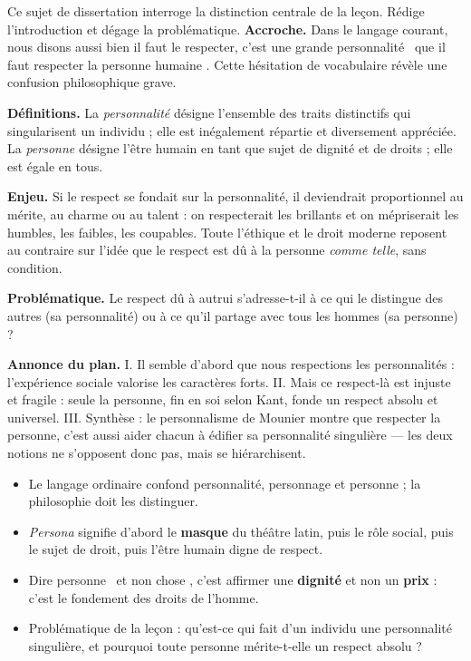 \documentclass[11pt]{article}
\newcommand{\cle}[1]{{\popxbold\color{popdark}#1}}
\begin{document}
\begin{exoresolu}
Ce sujet de dissertation interroge la distinction centrale de la leçon. Rédige l'introduction et dégage la problématique.
\tcblower
\textbf{Accroche.} Dans le langage courant, nous disons aussi bien \guillemotleft il faut le respecter, c'est une grande personnalité \guillemotright\ que \guillemotleft il faut respecter la personne humaine \guillemotright. Cette hésitation de vocabulaire révèle une confusion philosophique grave.

\textbf{Définitions.} La \emph{personnalité} désigne l'ensemble des traits distinctifs qui singularisent un individu ; elle est inégalement répartie et diversement appréciée. La \emph{personne} désigne l'être humain en tant que sujet de dignité et de droits ; elle est égale en tous.

\textbf{Enjeu.} Si le respect se fondait sur la personnalité, il deviendrait proportionnel au mérite, au charme ou au talent : on respecterait les brillants et on mépriserait les humbles, les faibles, les coupables. Toute l'éthique et le droit moderne reposent au contraire sur l'idée que le respect est dû à la personne \emph{comme telle}, sans condition.

\textbf{Problématique.} Le respect dû à autrui s'adresse-t-il à ce qui le distingue des autres (sa personnalité) ou à ce qu'il partage avec tous les hommes (sa personne) ?

\textbf{Annonce du plan.} I. Il semble d'abord que nous respections les personnalités : l'expérience sociale valorise les caractères forts. II. Mais ce respect-là est injuste et fragile : seule la personne, fin en soi selon Kant, fonde un respect absolu et universel. III. Synthèse : le personnalisme de Mounier montre que respecter la personne, c'est aussi aider chacun à édifier sa personnalité singulière — les deux notions ne s'opposent donc pas, mais se hiérarchisent.
\end{exoresolu}

\begin{aretenir}
\begin{itemize}
\item Le langage ordinaire confond \cle{personnalité}, \cle{personnage} et \cle{personne} ; la philosophie doit les distinguer.
\item \emph{Persona} signifie d'abord le \textbf{masque} du théâtre latin, puis le rôle social, puis le sujet de droit, puis l'être humain digne de respect.
\item Dire \guillemotleft personne \guillemotright\ et non \guillemotleft chose \guillemotright, c'est affirmer une \textbf{dignité} et non un \textbf{prix} : c'est le fondement des droits de l'homme.
\item Problématique de la leçon : qu'est-ce qui fait d'un individu une personnalité singulière, et pourquoi toute personne mérite-t-elle un respect absolu ?
\end{itemize}
\end{aretenir}
\end{document}

